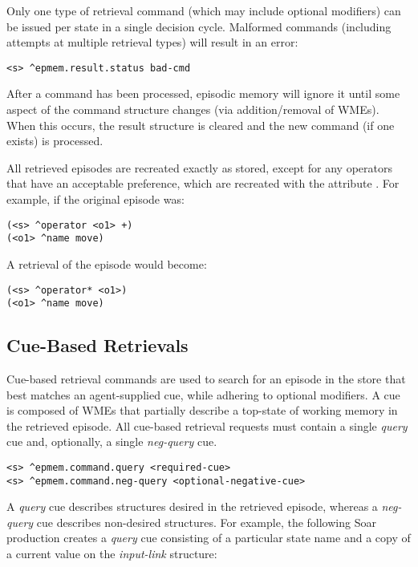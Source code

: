 Only one type of retrieval command (which may include optional modifiers) can be issued per state in a single decision cycle.  
Malformed commands (including attempts at multiple retrieval types) will result in an error:

\begin{verbatim}
<s> ^epmem.result.status bad-cmd
\end{verbatim}

After a command has been processed, episodic memory will ignore it until some aspect of the command structure changes (via addition/removal of WMEs).  
When this occurs, the result structure is cleared and the new command (if one exists) is processed.

All retrieved episodes are recreated exactly as stored, except for any operators that have an acceptable preference, which are recreated with the attribute .
For example, if the original episode was:

\begin{verbatim}
(<s> ^operator <o1> +)
(<o1> ^name move)
\end{verbatim}

A retrieval of the episode would become:

\begin{verbatim}
(<s> ^operator* <o1>)
(<o1> ^name move)
\end{verbatim}

\subsection{Cue-Based Retrievals}
Cue-based retrieval commands are used to search for an episode in the store that best matches an agent-supplied cue, while adhering to optional modifiers.  
A cue is composed of WMEs that partially describe a top-state of working memory in the retrieved episode.  
All cue-based retrieval requests must contain a single \emph{query} cue and, optionally, a single \emph{neg-query} cue.  

\begin{verbatim}
<s> ^epmem.command.query <required-cue>
<s> ^epmem.command.neg-query <optional-negative-cue>
\end{verbatim}

A \emph{query} cue describes structures desired in the retrieved episode, whereas a \emph{neg-query} cue describes non-desired structures.  
For example, the following Soar production creates a \emph{query} cue consisting of a particular state name and a copy of a current value on the \emph{input-link} structure:

